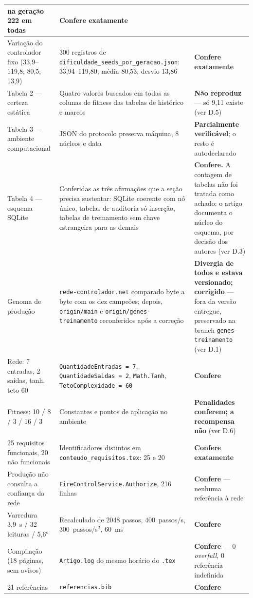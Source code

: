 \documentclass[11pt,a4paper]{article}
\begin{document}
\begin{longtable}{|p{3.6cm}|p{6.6cm}|p{4.4cm}|}
na geração 222 em todas & \textbf{Confere exatamente} \\
\hline
Variação do controlador fixo (33,9--119,8; 80,5; 13,9) & 300 registros de
\texttt{dificuldade\_seeds\_por\_geracao.json}: 33,94--119,80; média 80,53; desvio 13,86 &
\textbf{Confere exatamente} \\
\hline
Tabela 2 --- certeza estática & Quatro valores buscados em todas as colunas de fitness das tabelas de
histórico e marcos & \textbf{Não reproduz} --- só 9,11 existe (ver D.5) \\
\hline
Tabela 3 --- ambiente computacional & JSON do protocolo preserva máquina, 8 núcleos e data &
\textbf{Parcialmente verificável}; o resto é autodeclarado \\
\hline
Tabela 4 --- esquema SQLite & Conferidas as três afirmações que a seção precisa sustentar: SQLite
coerente com nó único, tabelas de auditoria só-inserção, tabelas de treinamento sem chave estrangeira
para as demais & \textbf{Confere.} A contagem de tabelas não foi tratada como achado: o artigo
documenta o núcleo do esquema, por decisão dos autores (ver D.3) \\
\hline
Genoma de produção & \texttt{rede-controlador.net} comparado byte a byte com os dez campeões; depois,
\texttt{origin/main} e \texttt{origin/genes-treinamento} reconferidos após a correção &
\textbf{Divergia de todos e estava versionado; corrigido} --- fora da versão entregue, preservado na
branch \texttt{genes-treinamento} (ver D.1) \\
\hline
Rede: 7 entradas, 2 saídas, tanh, teto 60 & \texttt{QuantidadeEntradas = 7},
\texttt{QuantidadeSaidas = 2}, \texttt{Math.Tanh}, \texttt{TetoComplexidade = 60} &
\textbf{Confere} \\
\hline
Fitness: 10 / 8 / 3 / 16 / 3 & Constantes e pontos de aplicação no ambiente &
\textbf{Penalidades conferem; a recompensa não} (ver D.6) \\
\hline
25 requisitos funcionais, 20 não funcionais & Identificadores distintos em
\texttt{conteudo\_requisitos.tex}: 25 e 20 & \textbf{Confere exatamente} \\
\hline
Produção não consulta a confiança da rede & \texttt{FireControlService.Authorize}, 216 linhas &
\textbf{Confere} --- nenhuma referência à rede \\
\hline
Varredura 3,9~s / 32 leituras / 5,6° & Recalculado de 2048 passos, 400~passos/s, 300~passos/s$^2$,
60~ms & \textbf{Confere} \\
\hline
Compilação (18 páginas, sem avisos) & \texttt{Artigo.log} do mesmo horário do \texttt{.tex} &
\textbf{Confere} --- 0 \textit{overfull}, 0 referência indefinida \\
\hline
21 referências & \texttt{referencias.bib} & \textbf{Confere} \\
\hline
\end{longtable}
\end{document}
